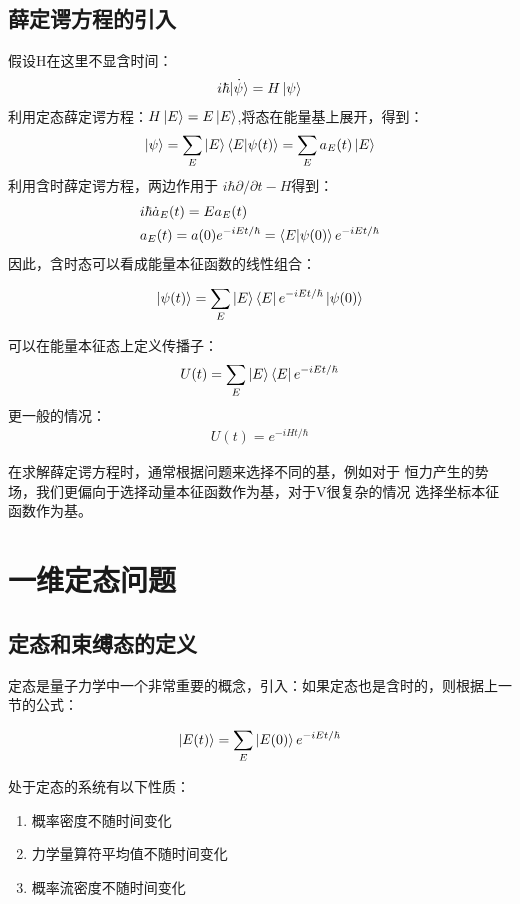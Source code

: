 \documentclass[UTF8]{article}
\numberwithin{equation}{section}
\begin{document}
\subsection{薛定谔方程的引入}
假设H在这里不显含时间：
\begin{align*}
    i\hbar \dot{\ket{\psi}}=H\ket{\psi}
\end{align*}
利用定态薛定谔方程：$H\ket{E}=E\ket{E}$,将态在能量基上展开，得到：
\begin{align*}
    \ket{\psi}=\sum_E
    \ket{E}\braket{E}{\psi(t)}=\sum_E a_E (t)\ket{E}
\end{align*}
利用含时薛定谔方程，两边作用于
$i\hbar \partial/ \partial t-H$得到：
\begin{align*}
     & i\hbar \dot{a}_E(t)=Ea_E(t)                                 \\
     & a_E(t)=a(0)e^{-iEt/\hbar}=\braket{E}{\psi(0)}e^{-iEt/\hbar} 
\end{align*}
因此，含时态可以看成能量本征函数的线性组合：
\begin{tcolorbox}[colframe=red]
    $$\ket{\psi(t)}=\sum_E \ket{E}\bra{E}e^{-iEt/\hbar}\ket{\psi(0)}$$
\end{tcolorbox}
\noindent 可以在能量本征态上定义传播子：
\begin{align*}
    U(t) = \sum_E \ket{E}\bra{E}e^{-iEt/\hbar}
\end{align*}
更一般的情况：
\begin{align*}
    U(t)=e^{-iHt/\hbar}
\end{align*}

在求解薛定谔方程时，通常根据问题来选择不同的基，例如对于
恒力产生的势场，我们更偏向于选择动量本征函数作为基，对于V很复杂的情况
选择坐标本征函数作为基。
\section{一维定态问题}
\subsection{定态和束缚态的定义}
定态是量子力学中一个非常重要的概念，引入：如果定态也是含时的，则根据上一节的公式：
\begin{tcolorbox}[
    colframe = red,
    title = 定态的定义
]
    \begin{equation*}
        \ket{E(t)} = \sum_E \ket{E(0)}e^{-iEt/\hbar}
    \end{equation*}
\end{tcolorbox}
处于定态的系统有以下性质：
\begin{enumerate}
    \item 概率密度不随时间变化
    \item 力学量算符平均值不随时间变化
    \item 概率流密度不随时间变化
\end{enumerate}
\end{document}
